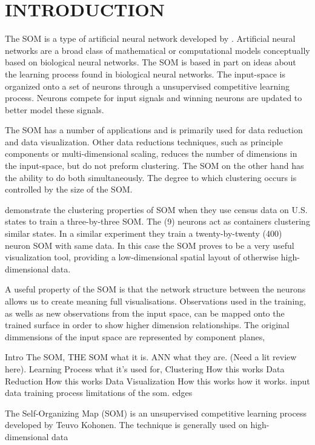
\chapter{INTRODUCTION}
The SOM is a type of artificial neural network developed by \cite{Kohonen}. 
Artificial neural networks are a broad class of mathematical or computational
models conceptually based on biological neural networks.  The SOM is based in part
on ideas about the learning process found in biological neural networks.  The
input-space is organized onto a set of neurons through a unsupervised
competitive learning process.  Neurons compete for input signals and winning
neurons are updated to better model these signals.

The SOM has a number of applications and is primarily used for data reduction
and data visualization.  Other data reductions techniques, such as principle
components or multi-dimensional scaling, reduces the number of dimensions in
the input-space, but do not preform clustering.  The SOM on the other hand has
the ability to do both simultaneously.  The degree to which clustering occurs
is controlled by the size of the SOM.  

\cite{skupin08} demonstrate the clustering properties of SOM when they use
census data on U.S. states to train a three-by-three SOM.  The (9) neurons act
as containers clustering similar states.  In a similar experiment they train a
twenty-by-twenty (400) neuron SOM with same data.  In this case the SOM proves
to be a very useful visualization tool, providing a low-dimensional spatial
layout of otherwise high-dimensional data.

A useful property of the SOM is that the network structure between the neurons
allows us to create meaning full visualisations.  Observations used in the
training, as wells as new observations from the input space,  can be mapped
onto the trained surface in order to show higher dimension relationships. The
original dimmensions of the input space are represented by component planes, 


Intro The SOM, 
	THE SOM
		what it is.
			ANN
				what they are. (Need a lit review here).
			Learning Process
		what it's used for, 
			Clustering
				How this works
			Data Reduction
				How this works
			Data Visualization
				How this works
		how it works.
			input data
			training process
		limitations of the som.
			edges
		

The Self-Organizing Map (SOM) is an unsupervised competitive learning process
developed by Teuvo Kohonen.
The technique is generally used on high-dimensional data

